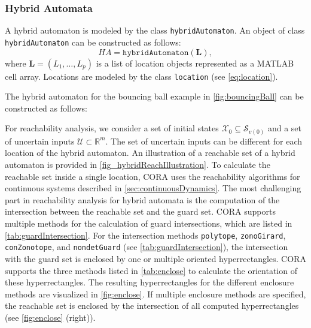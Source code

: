 \subsubsection{Hybrid Automata} \label{sec:hybridAutomaton}

A hybrid automaton is modeled by the class \texttt{hybridAutomaton}. An object of class \texttt{hybridAutomaton} can be constructed as follows:
\begin{equation*}
    HA = \texttt{hybridAutomaton}(\mathbf{L}),
\end{equation*}
where $\mathbf{L} = (L_1,\dots,L_p)$ is a list of location objects represented as a MATLAB cell array. Locations are modeled by the class \texttt{location} (see \eqref{eq:location}).

The hybrid automaton for the bouncing ball example in \cref{fig:bouncingBall} can be constructed as follows:

\begin{center}
    \begin{minipage}[t]{0.1\textwidth}
        \vspace{10pt}
    \end{minipage}
    \begin{minipage}[t]{0.8\textwidth}
        \footnotesize
        
    \end{minipage}
\end{center}

\vspace{1cm}

\label{sec:hybridAutomatonReach}

For reachability analysis, we consider a set of initial states $\mathcal{X}_0 \subseteq \mathcal{S}_{v(0)}$ and a set of uncertain inputs $\mathcal{U} \subset \mathbb{R}^m$. The set of uncertain inputs can be different for each location of the hybrid automaton. An illustration of a reachable set of a hybrid automaton is provided in \cref{fig_hybridReachIllustration}. To calculate the reachable set inside a single location, CORA uses the reachability algorithms for continuous systems described in \cref{sec:continuousDynamics}. The most challenging part in reachability analysis for hybrid automata is the computation of the intersection between the reachable set and the guard set. CORA supports multiple methods for the calculation of guard intersections, which are listed in \cref{tab:guardIntersection}. For the intersection methods \texttt{polytope}, \texttt{zonoGirard}, \texttt{conZonotope}, and \texttt{nondetGuard} (see \cref{tab:guardIntersection}), the intersection with the guard set is enclosed by one or multiple oriented hyperrectangles. CORA supports the three methods listed in \cref{tab:enclose} to calculate the orientation of these hyperrectangles. The resulting hyperrectangles for the different enclosure methods are visualized in \cref{fig:enclose}. If multiple enclosure methods are specified, the reachable set is enclosed by the intersection of all computed hyperrectangles (see \cref{fig:enclose} (right)).


